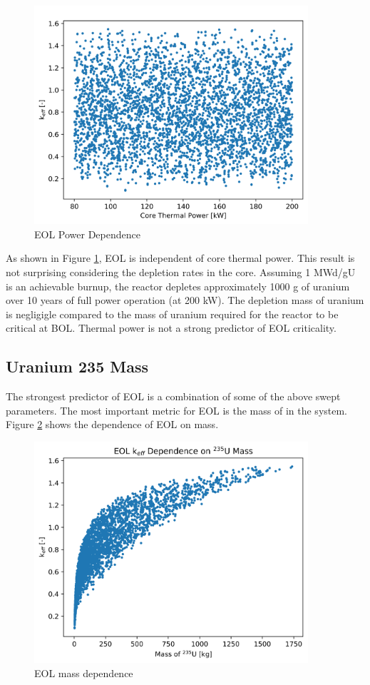 \begin{figure}[h]
    \centering
    \includegraphics[width=4in]{../images/keff_vs_power.png}
\caption{EOL \keff Power Dependence}
\label{fig:eol_keff_vs_power}
\end{figure}

As shown in Figure \ref{fig:eol_keff_vs_power}, EOL \keff is independent of core
thermal power. This result is not surprising considering the depletion rates in
the core. Assuming 1 MWd/gU is an achievable burnup, the reactor depletes
approximately 1000 g of uranium over 10 years of full power operation (at 200
kW). The depletion mass
of uranium is negligigle compared to the mass of uranium required for the
reactor to be critical at BOL. Thermal power is not a strong predictor of EOL
criticality.

\subsection{Uranium 235 Mass}
The strongest predictor of EOL \keff is a combination of some of the above
swept parameters. The most important metric for EOL \keff is the mass of \uran
in the system. Figure \ref{fig:eol_keff_vs_235_mass} shows the dependence of EOL
\keff on \uran mass.

\begin{figure}[h]
    \centering
    \includegraphics[width=4in]{../images/keff_vs_mass_235.png}
\caption{EOL \keff \uran mass dependence}
\label{fig:eol_keff_vs_235_mass}
\end{figure}

